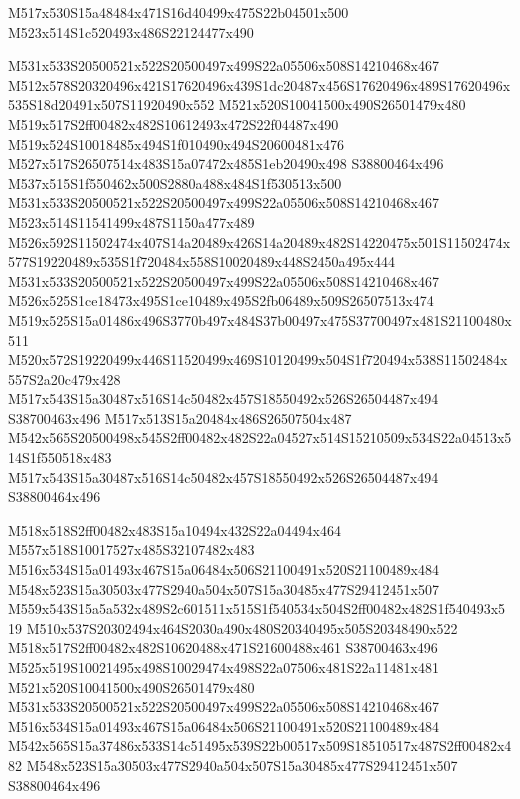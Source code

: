 \documentclass{article}
\begin{document}
\begin{multicols}{2}
\begin{center}
M517x530S15a48484x471S16d40499x475S22b04501x500 M523x514S1c520493x486S22124477x490 
\end{center}


M531x533S20500521x522S20500497x499S22a05506x508S14210468x467 M512x578S20320496x421S17620496x439S1dc20487x456S17620496x489S17620496x535S18d20491x507S11920490x552 M521x520S10041500x490S26501479x480 M519x517S2ff00482x482S10612493x472S22f04487x490 M519x524S10018485x494S1f010490x494S20600481x476 M527x517S26507514x483S15a07472x485S1eb20490x498 S38800464x496 M537x515S1f550462x500S2880a488x484S1f530513x500 M531x533S20500521x522S20500497x499S22a05506x508S14210468x467 M523x514S11541499x487S1150a477x489 M526x592S11502474x407S14a20489x426S14a20489x482S14220475x501S11502474x577S19220489x535S1f720484x558S10020489x448S2450a495x444 M531x533S20500521x522S20500497x499S22a05506x508S14210468x467 M526x525S1ce18473x495S1ce10489x495S2fb06489x509S26507513x474 M519x525S15a01486x496S3770b497x484S37b00497x475S37700497x481S21100480x511 M520x572S19220499x446S11520499x469S10120499x504S1f720494x538S11502484x557S2a20c479x428 M517x543S15a30487x516S14c50482x457S18550492x526S26504487x494 S38700463x496 M517x513S15a20484x486S26507504x487 M542x565S20500498x545S2ff00482x482S22a04527x514S15210509x534S22a04513x514S1f550518x483 M517x543S15a30487x516S14c50482x457S18550492x526S26504487x494 S38800464x496

M518x518S2ff00482x483S15a10494x432S22a04494x464 M557x518S10017527x485S32107482x483 M516x534S15a01493x467S15a06484x506S21100491x520S21100489x484 M548x523S15a30503x477S2940a504x507S15a30485x477S29412451x507 M559x543S15a5a532x489S2c601511x515S1f540534x504S2ff00482x482S1f540493x519 M510x537S20302494x464S2030a490x480S20340495x505S20348490x522 M518x517S2ff00482x482S10620488x471S21600488x461 S38700463x496 M525x519S10021495x498S10029474x498S22a07506x481S22a11481x481 M521x520S10041500x490S26501479x480 M531x533S20500521x522S20500497x499S22a05506x508S14210468x467 M516x534S15a01493x467S15a06484x506S21100491x520S21100489x484 M542x565S15a37486x533S14c51495x539S22b00517x509S18510517x487S2ff00482x482 M548x523S15a30503x477S2940a504x507S15a30485x477S29412451x507 S38800464x496


\end{multicols}
\end{document}
